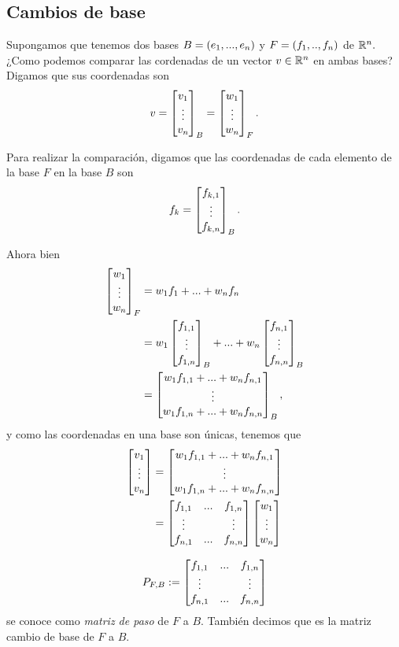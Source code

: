 \subsection*{Cambios de base}

Supongamos que tenemos dos bases $B=\left( e_{1},...,e_{n} \right)$ y $F=\left( f_{1},..,f_{n} \right)$ de $\mathbb{R}^{n}.$ ¿Como podemos
comparar las cordenadas de un vector $v\in \mathbb{R}^{n}$ en ambas bases? Digamos que sus coordenadas son
$$
v=\begin{bmatrix}v_{1}\\ \vdots \\ v_{n}\end{bmatrix}_{B} = \begin{bmatrix}w_{1} \\ \vdots \\ w_{n}\end{bmatrix}_{F}.
$$

Para realizar la comparación, digamos que
las coordenadas de cada elemento de la base $F$ en la base $B$ son
$$
f_{k}=\begin{bmatrix}f_{k,1}\\ \vdots \\ f_{k,n}\end{bmatrix}_{B}.
$$

Ahora bien
\begin{align*}
 \begin{bmatrix}w_{1} \\ \vdots \\ w_{n}\end{bmatrix}_{F}
 &=w_{1}f_{1}+...+w_{n}f_{n} \\
 &=w_{1}\begin{bmatrix}f_{1,1}\\ \vdots \\ f_{1,n}\end{bmatrix}_{B}+...+w_{n}\begin{bmatrix}f_{n,1}\\ \vdots \\ f_{n,n}\end{bmatrix}_{B} \\
 &=\begin{bmatrix}w_{1}f_{1,1}+...+w_{n}f_{n,1}\\  \vdots \\
w_{1}f_{1,n}+...+w_{n}f_{n,n} \end{bmatrix}_{B},
\end{align*}
y como las coordenadas en una base son únicas, tenemos que
\begin{align*}
 \begin{bmatrix}v_{1}\\ \vdots \\ v_{n}\end{bmatrix} & = \begin{bmatrix}w_{1}f_{1,1}+...+w_{n}f_{n,1}\\  \vdots \\
w_{1}f_{1,n}+...+w_{n}f_{n,n} \end{bmatrix} \\
&= \begin{bmatrix}f_{1,1} & ... & f_{1,n} \\ \vdots & & \vdots \\ f_{n,1} & ... & f_{n,n}\end{bmatrix} \begin{bmatrix}w_{1} \\ \vdots \\ w_{n}\end{bmatrix}
\end{align*}

\begin{defn}
 $$P_{F,B}:=\begin{bmatrix}f_{1,1} & ... & f_{1,n} \\ \vdots & & \vdots \\ f_{n,1} & ... & f_{n,n}\end{bmatrix}$$ se conoce como \emph{matriz
de paso} de $F$ a $B$. También decimos que es la matriz cambio de base de $F$ a $B$.
\end{defn}


